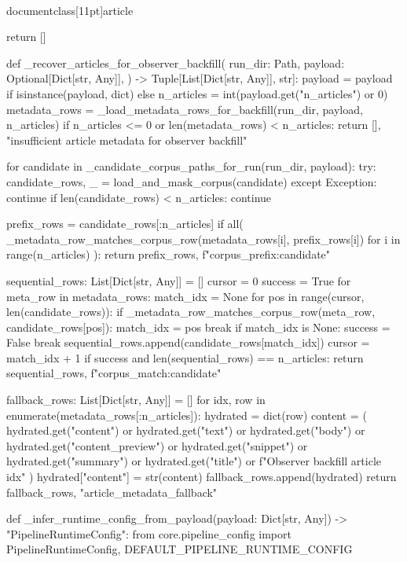 \\documentclass[11pt]{article}
\begin{document}
\begin{CodeBlock}
    return []


def _recover_articles_for_observer_backfill(
    run_dir: Path,
    payload: Optional[Dict[str, Any]],
) -> Tuple[List[Dict[str, Any]], str]:
    payload = payload if isinstance(payload, dict) else {}
    n_articles = int(payload.get("n_articles") or 0)
    metadata_rows = _load_metadata_rows_for_backfill(run_dir, payload, n_articles)
    if n_articles <= 0 or len(metadata_rows) < n_articles:
        return [], "insufficient article metadata for observer backfill"

    for candidate in _candidate_corpus_paths_for_run(run_dir, payload):
        try:
            candidate_rows, _ = load_and_mask_corpus(candidate)
        except Exception:
            continue
        if len(candidate_rows) < n_articles:
            continue

        prefix_rows = candidate_rows[:n_articles]
        if all(
            _metadata_row_matches_corpus_row(metadata_rows[i], prefix_rows[i])
            for i in range(n_articles)
        ):
            return prefix_rows, f"corpus_prefix:{candidate}"

        sequential_rows: List[Dict[str, Any]] = []
        cursor = 0
        success = True
        for meta_row in metadata_rows:
            match_idx = None
            for pos in range(cursor, len(candidate_rows)):
                if _metadata_row_matches_corpus_row(meta_row, candidate_rows[pos]):
                    match_idx = pos
                    break
            if match_idx is None:
                success = False
                break
            sequential_rows.append(candidate_rows[match_idx])
            cursor = match_idx + 1
        if success and len(sequential_rows) == n_articles:
            return sequential_rows, f"corpus_match:{candidate}"

    fallback_rows: List[Dict[str, Any]] = []
    for idx, row in enumerate(metadata_rows[:n_articles]):
        hydrated = dict(row)
        content = (
            hydrated.get("content")
            or hydrated.get("text")
            or hydrated.get("body")
            or hydrated.get("content_preview")
            or hydrated.get("snippet")
            or hydrated.get("summary")
            or hydrated.get("title")
            or f"Observer backfill article {idx}"
        )
        hydrated["content"] = str(content)
        fallback_rows.append(hydrated)
    return fallback_rows, "article_metadata_fallback"


def _infer_runtime_config_from_payload(payload: Dict[str, Any]) -> "PipelineRuntimeConfig":
    from core.pipeline_config import PipelineRuntimeConfig, DEFAULT_PIPELINE_RUNTIME_CONFIG


\end{CodeBlock}
\end{document}
